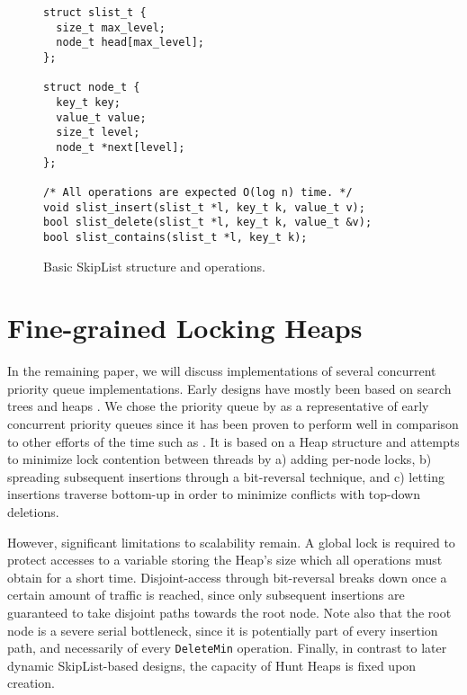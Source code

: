 \begin{figure}[ht]
\begin{lstlisting}
struct slist_t {
  size_t max_level;
  node_t head[max_level];
};

struct node_t {
  key_t key;
  value_t value;
  size_t level;
  node_t *next[level];
};

/* All operations are expected O(log n) time. */
void slist_insert(slist_t *l, key_t k, value_t v);
bool slist_delete(slist_t *l, key_t k, value_t &v);
bool slist_contains(slist_t *l, key_t k);
\end{lstlisting}
\caption{Basic SkipList structure and operations.}
\label{fig:basicsl}
\end{figure}

\section{Fine-grained Locking Heaps} \label{sec:hunt}

In the remaining paper, we will discuss implementations of several concurrent priority queue implementations.
Early designs have mostly been based on search trees \cite{boyar1994chromatic,johnson1991highly} and
heaps \cite{ayani1990lr,biswas1987simultaneous,das1996distributed,deo1992parallel,huang1991evaluation,
luchetti1993some,mans1998portable,olariu1991optimal,prasad1995parallel}.
We chose the priority queue by \citeauthor{hunt1996efficient} \cite{hunt1996efficient}
as a representative of early concurrent priority queues since it has been proven to
perform well \cite{shavit2000skiplist} in comparison to other efforts of the time such as \cite{nageshwara1988concurrent,ayani1990lr,yan1998lock}. %
It is based on a Heap
structure and attempts to minimize lock contention between threads by a) adding per-node
locks, b) spreading subsequent insertions through a bit-reversal technique, %
and c) letting insertions traverse bottom-up in order to minimize conflicts with
top-down deletions.

However, significant limitations to scalability remain. A global lock is required
to protect accesses to a variable storing the Heap's size which all operations
must obtain for a short time. Disjoint-access through bit-reversal breaks down
once a certain amount of traffic is reached, since only subsequent insertions
are guaranteed to take disjoint paths towards the root node. Note also that
the root node is a severe serial bottleneck, since it is potentially part of
every insertion path, and necessarily of every \lstinline|DeleteMin| operation.
Finally, in contrast to later dynamic SkipList-based designs, the capacity of Hunt Heaps
is fixed upon creation.

